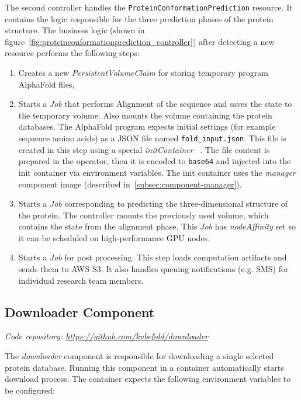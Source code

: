 The second controller handles the \texttt{ProteinConformationPrediction} resource.
It contains the logic responsible for the three prediction phases of the protein structure.
The business logic (shown in figure~\ref{fig:proteinconformationprediction_controller}) after detecting a new resource performs the following steps:
\begin{enumerate}
    \item Creates a new \textit{PersistentVolumeClaim} for storing temporary program AlphaFold files,
    \item Starts a \textit{Job} that performs Alignment of the sequence and saves the state to the temporary volume.
    Also mounts the volume containing the protein databases.
    The AlphaFold program expects initial settings (for example sequence amino acids) as a JSON file named \texttt{fold\_input.json}.
    This file is created in this step using a special \textit{initContainer} ~\cite{k8s_init_containers}.
    The file content is prepared in the operator, then it is encoded to \texttt{base64} and injected into the init container via environment variables.
    The init container uses the \textit{manager} component image (described in~\ref{subsec:component-manager}).
    \item Starts a \textit{Job} corresponding to predicting the three-dimensional structure of the protein.
    The controller mounts the previously used volume, which contains the state from the alignment phase.
    This \textit{Job} has \textit{nodeAffinity} set so it can be scheduled on high-performance GPU nodes.
    \item Starts a \textit{Job} for post processing.
    This step loads computation artifacts and sends them to AWS S3. It also handles queuing notifications (e.g.
    SMS) for individual research team members.
\end{enumerate}

\subsection{Downloader Component}\label{subsec:component-downloader}
\textit{Code repository: \url{https://github.com/kubefold/downloader}}

The \textit{downloader} component is responsible for downloading a single selected protein database.
Running this component in a container automatically starts download process.
The container expects the following environment variables to be configured:

